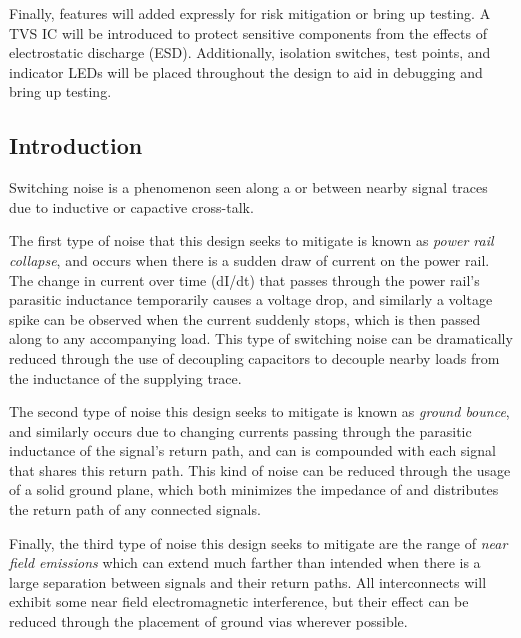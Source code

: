 \documentclass{article}
\newcommand*{\Indent}{\hspace*{1cm}}
\begin{document}
\Indent Finally, features will added expressly for risk mitigation or bring up testing.
A TVS IC will be introduced to protect sensitive components from the effects of electrostatic discharge (ESD).
Additionally, isolation switches, test points, and indicator LEDs will be placed throughout the design to aid in debugging and bring up testing.

\subsection{Introduction}
Switching noise is a phenomenon seen along a or between nearby signal traces due to inductive or capactive cross-talk. 

\Indent The first type of noise that this design seeks to mitigate is known as \textit{power rail collapse}, and occurs when there is a sudden draw of current on the power rail.
The change in current over time (dI/dt) that passes through the power rail's parasitic inductance temporarily causes a voltage drop, and similarly a voltage spike can be observed when the current suddenly stops, which is then passed along to any accompanying load.
This type of switching noise can be dramatically reduced through the use of decoupling capacitors to decouple nearby loads from the inductance of the supplying trace.

\Indent The second type of noise this design seeks to mitigate is known as \textit{ground bounce}, and similarly occurs due to changing currents passing through the parasitic inductance of the signal's return path, and can is compounded with each signal that shares this return path. 
This kind of noise can be reduced through the usage of a solid ground plane, which both minimizes the impedance of and distributes the return path of any connected signals.

\Indent Finally, the third type of noise this design seeks to mitigate are the range of \textit{near field emissions} which can extend much farther than intended when there is a large separation between signals and their return paths.
All interconnects will exhibit some near field electromagnetic interference, but their effect can be reduced through the placement of ground vias wherever possible.

\end{document}
